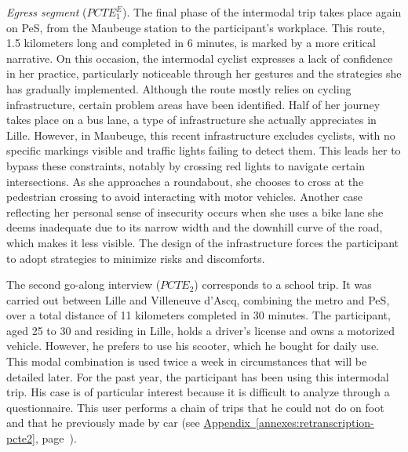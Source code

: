 \begin{refsegment}
\textsl{Egress segment} (\(PCTE^{E}_{1}\)). The final phase of the intermodal trip takes place again on \acrshort{PeS}, from the Maubeuge station to the participant's workplace. This route, 1.5 kilometers long and completed in 6 minutes, is marked by a more critical narrative. On this occasion, the intermodal cyclist expresses a lack of confidence in her practice, particularly noticeable through her gestures and the strategies she has gradually implemented. Although the route mostly relies on cycling infrastructure, certain problem areas have been identified. Half of her journey takes place on a bus lane, a type of infrastructure she actually appreciates in Lille. However, in Maubeuge, this recent infrastructure excludes cyclists, with no specific markings visible and traffic lights failing to detect them. This leads her to bypass these constraints, notably by crossing red lights to navigate certain intersections. As she approaches a roundabout, she chooses to cross at the pedestrian crossing to avoid interacting with motor vehicles. Another case reflecting her personal sense of insecurity occurs when she uses a bike lane she deems inadequate due to its narrow width and the downhill curve of the road, which makes it less visible. The design of the infrastructure forces the participant to adopt strategies to minimize risks and discomforts.%

The second go-along interview (\(PCTE_{2}\)) corresponds to a school trip. It was carried out between Lille and Villeneuve d'Ascq, combining the metro and \acrshort{PeS}, over a total distance of 11 kilometers completed in 30 minutes. The participant, aged 25 to 30 and residing in Lille, holds a driver's license and owns a motorized vehicle. However, he prefers to use his  scooter, which he bought for daily use. This modal combination is used twice a week in circumstances that will be detailed later. For the past year, the participant has been using this intermodal trip. His case is of particular interest because it is difficult to analyze through a questionnaire. This user performs a chain of trips that he could not do on foot and that he previously made by car (see \hyperref[annexes:retranscription-pcte2]{Appendix~\ref{annexes:retranscription-pcte2}}, page~\pageref{annexes:retranscription-pcte2}).%


\end{refsegment}
